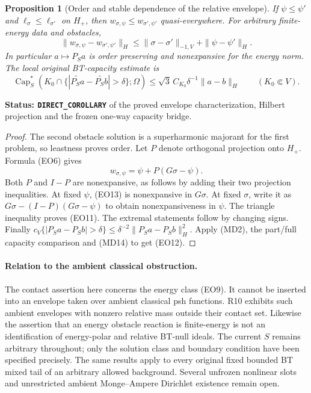 \documentclass[11pt,a4paper]{article}
\numberwithin{equation}{section}
\newtheorem{proposition}[theorem]{Proposition}
\theoremstyle{definition}
\theoremstyle{remark}
\begin{document}
\begin{proposition}[Order and stable dependence of the relative envelope]
\label{prop:r11-energy-obstacle-stability}
If $\psi\leq\psi'$ and $\ell_\sigma\leq\ell_{\sigma'}$ on $H_+$,
then
$w_{\sigma,\psi}\leq w_{\sigma',\psi'}$ quasi-everywhere.
For arbitrary finite-energy data and obstacles,
\[
 \|w_{\sigma,\psi}-w_{\sigma',\psi'}\|_H
          \leq\|\sigma-\sigma'\|_{-1,V}+\|\psi-\psi'\|_H.
 \tag{EO11}
\]
In particular $a\mapsto P_Sa$ is order preserving and
nonexpansive for the energy norm.  The local original
BT-capacity estimate is
\[
 \operatorname{Cap}_S^*
   (K_0\cap\{|\widetilde{P_Sa}-\widetilde{P_Sb}|>\delta\};\Omega)
       \leq\sqrt3\,C_{K_0}\delta^{-1}\|a-b\|_H
                         \qquad(K_0\Subset V).
 \tag{EO12}
\]
\end{proposition}

\noindent\textbf{Status: \texttt{DIRECT\_COROLLARY}} of the
proved envelope characterization, Hilbert projection and
the frozen one-way capacity bridge.

\begin{proof}
The second obstacle solution is a superharmonic majorant
for the first problem, so leastness proves order.
Let $P$ denote orthogonal projection onto $H_+$.
Formula (EO6) gives
\[
                     w_{\sigma,\psi}
                       =\psi+P(G\sigma-\psi).
 \tag{EO13}
\]
Both $P$ and $I-P$ are nonexpansive, as follows by adding
their two projection inequalities.
At fixed $\psi$, (EO13) is nonexpansive in $G\sigma$.
At fixed $\sigma$, write it as
$G\sigma-(I-P)(G\sigma-\psi)$ to obtain nonexpansiveness
in $\psi$.  The triangle inequality proves (EO11).
The extremal statements follow by changing signs.
Finally $c_V\{|P_Sa-P_Sb|>\delta\}\leq
\delta^{-2}\|P_Sa-P_Sb\|_H^2$.
Apply (MD2), the part/full capacity comparison and (MD14)
to get (EO12).
\end{proof}

\paragraph{Relation to the ambient classical obstruction.}
The contact assertion here concerns the energy class (EO9).
It cannot be inserted into an envelope taken over ambient
classical psh functions.  R10 exhibits such ambient envelopes
with nonzero relative mass outside their contact set.
Likewise the assertion that an energy obstacle reaction is
finite-energy is not an identification of energy-polar and
relative BT-null ideals.  The current $S$ remains arbitrary
throughout; only the solution class and boundary condition
have been specified precisely.
The same results apply to every original fixed bounded BT
mixed tail of an arbitrary allowed background.  Several
unfrozen nonlinear slots and unrestricted ambient
Monge--Ampere Dirichlet existence remain open.
\end{document}
